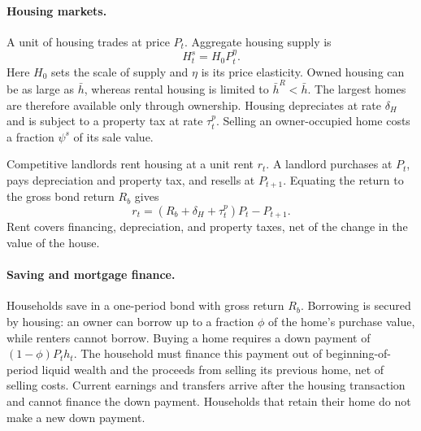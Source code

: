 \paragraph{Housing markets.}
A unit of housing trades at price $P_t$. Aggregate housing supply is
\begin{equation}
 H_t^s=H_0 P_t^{\eta}.
 \label{eq:env-housing-supply}
\end{equation}
Here $H_0$ sets the scale of supply and $\eta$ is its price elasticity.
Owned housing can be as large as $\bar h$, whereas rental housing is limited
to $\bar h^R<\bar h$. The largest homes are therefore available only through
ownership. Housing depreciates at rate $\delta_H$ and is subject to a
property tax at rate $\tau_t^p$. Selling an owner-occupied home costs a
fraction $\psi^s$ of its sale value.

Competitive landlords rent housing at a unit rent $r_t$. A landlord purchases
at $P_t$, pays depreciation and property tax, and resells at $P_{t+1}$.
Equating the return to the gross bond return $R_b$ gives
\begin{equation}
 r_t=(R_b+\delta_H+\tau_t^p)P_t-P_{t+1}.
 \label{eq:env-rent}
\end{equation}
Rent covers financing, depreciation, and property taxes, net of the change
in the value of the house.

\paragraph{Saving and mortgage finance.}
Households save in a one-period bond with gross return $R_b$. Borrowing is
secured by housing: an owner can borrow up to a fraction $\phi$ of the
home's purchase value, while renters cannot borrow. Buying a home requires
a down payment of $(1-\phi)P_t h_t$. The household must finance this payment
out of beginning-of-period liquid wealth and the proceeds from selling its
previous home, net of selling costs. Current earnings and transfers arrive
after the housing transaction and cannot finance the down payment.
Households that retain their home do not make a new down payment.

